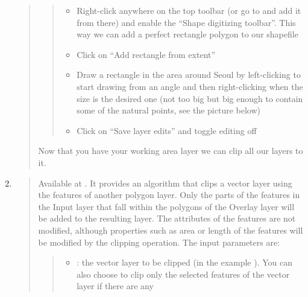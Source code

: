\documentclass[letterpaper,10pt,english]{sphinxmanual}
\begin{document}
\begin{enumerate}
\begin{quote}
\begin{quote}
\begin{itemize}
\item {} 
Right-click anywhere on the top toolbar (or go to  and add it from there)
and enable the “Shape digitizing toolbar”. This way we can add a perfect rectangle polygon to our shapefile

\item {} 
Click on “Add rectangle from extent”

\end{itemize}

\noindent{}
\begin{itemize}
\item {} 
Draw a rectangle in the area around Seoul by left-clicking to start drawing from an angle and then right-clicking
when the size is the desired one (not too big but big enough to contain some of the natural points, see the picture below)

\end{itemize}

\noindent{}
\begin{itemize}
\item {} 
Click on “Save layer edits” and toggle editing off

\end{itemize}
\end{quote}

Now that you have your working area layer we can clip all our layers to it.
\end{quote}

\item {} 
\begin{quote}

Available at . It provides an algorithm that clips a vector layer using the features of another polygon layer.
Only the parts of the features in the Input layer that fall within the polygons of the Overlay layer will be added to the resulting layer.
The attributes of the features are not modified, although properties such as area or length of the features will be modified by the clipping operation.
The input parameters are:
\begin{quote}
\begin{itemize}
\item {} 
: the vector layer to be clipped (in the example ). You can also choose to clip only the selected features of
the vector layer if there are any


\end{itemize}
\end{quote}
\end{quote}
\end{enumerate}
\end{document}
